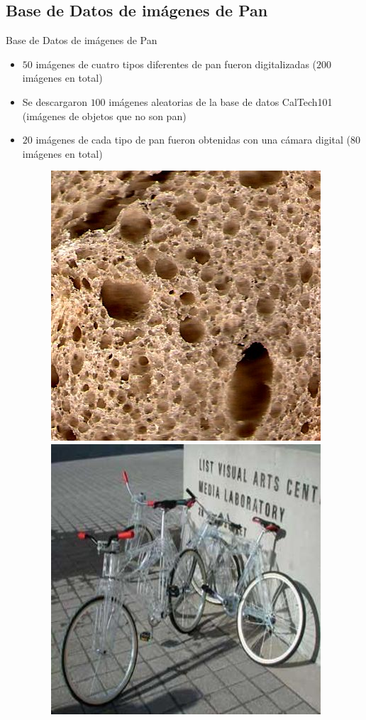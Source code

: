 \documentclass{beamer}
\begin{document}
\subsection{Base de Datos de im\'agenes de Pan}
\begin{frame}
{\huge Base de Datos de im\'agenes de Pan}
\begin{itemize}
\item $50$ im\'agenes de cuatro tipos diferentes de pan fueron digitalizadas ($200$ im\'agenes en total)
\item Se descargaron $100$ im\'agenes aleatorias de la base de datos CalTech101 (im\'agenes de objetos que no son pan)
\item $20$ im\'agenes de cada tipo de pan fueron obtenidas con una c\'amara digital ($80$ im\'agenes en total)
\begin{figure}
\centering
\includegraphics[scale=0.97]{../imagenes/baguette20}
\includegraphics[scale=0.2]{../exps/100sample/res/image_0351}

\end{figure}
\end{itemize}
\end{frame}
\end{document}
